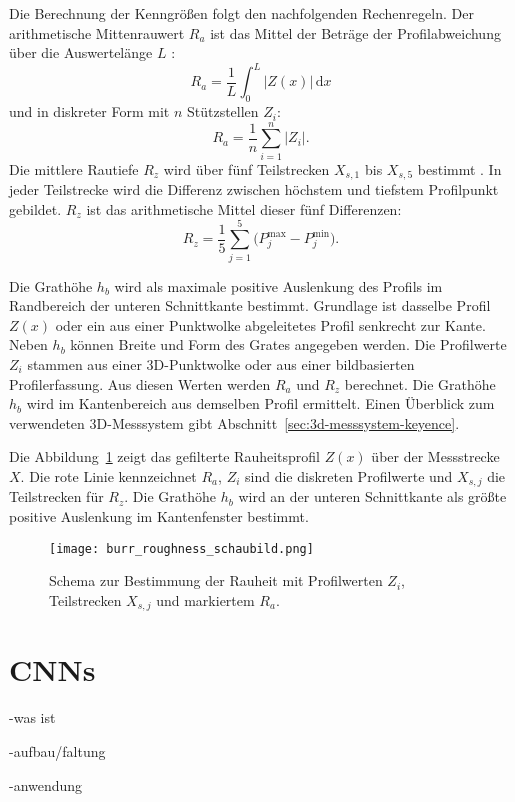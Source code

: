 Die Berechnung der Kenngrößen folgt den nachfolgenden Rechenregeln. Der arithmetische Mittenrauwert \(R_a\) ist das Mittel der Beträge der Profilabweichung über die Auswertelänge \(L\) \parencite{MitutoyoQuickGuide}:
\[
R_a=\frac{1}{L}\int_{0}^{L}\lvert Z(x)\rvert\,\mathrm{d}x
\]
und in diskreter Form mit \(n\) Stützstellen \(Z_i\):
\[
R_a=\frac{1}{n}\sum_{i=1}^{n}\lvert Z_i\rvert.
\]
Die mittlere Rautiefe \(R_z\) wird über fünf Teilstrecken \(X_{s,1}\) bis \(X_{s,5}\) bestimmt \parencite{KeyenceISO4287}. In jeder Teilstrecke wird die Differenz zwischen höchstem und tiefstem Profilpunkt gebildet. \(R_z\) ist das arithmetische Mittel dieser fünf Differenzen:
\[
R_z=\frac{1}{5}\sum_{j=1}^{5}\bigl(P^{\max}_{j}-P^{\min}_{j}\bigr).
\]

Die Grathöhe \(h_b\) wird als maximale positive Auslenkung des Profils im Randbereich der unteren Schnittkante bestimmt. Grundlage ist dasselbe Profil \(Z(x)\) oder ein aus einer Punktwolke abgeleitetes Profil senkrecht zur Kante. Neben \(h_b\) können Breite und Form des Grates angegeben werden.
Die Profilwerte \(Z_i\) stammen aus einer 3D-Punktwolke oder aus einer bildbasierten Profilerfassung. Aus diesen Werten werden \(R_a\) und \(R_z\) berechnet. Die Grathöhe \(h_b\) wird im Kantenbereich aus demselben Profil ermittelt. Einen Überblick zum verwendeten 3D-Messsystem gibt Abschnitt~\ref{sec:3d-messsystem-keyence}.

Die Abbildung~\ref{fig:roughness-profile} zeigt das gefilterte Rauheitsprofil \(Z(x)\) über der Messstrecke \(X\).
Die rote Linie kennzeichnet \(R_a\), \(Z_i\) sind die diskreten Profilwerte und \(X_{s,j}\) die Teilstrecken für \(R_z\). Die Grathöhe \(h_b\) wird an der unteren Schnittkante als größte positive Auslenkung im Kantenfenster bestimmt.

\begin{figure}[htbp]
  \centering
  \texttt{[image: burr\_roughness\_schaubild.png]}
  \caption[Schema zur Bestimmung der Rauheit]{Schema zur Bestimmung der Rauheit mit Profilwerten \(Z_i\), Teilstrecken \(X_{s,j}\) und markiertem \(R_a\).}
  \label{fig:roughness-profile}
\end{figure}


\section{CNNs}
-was ist

-aufbau/faltung

-anwendung